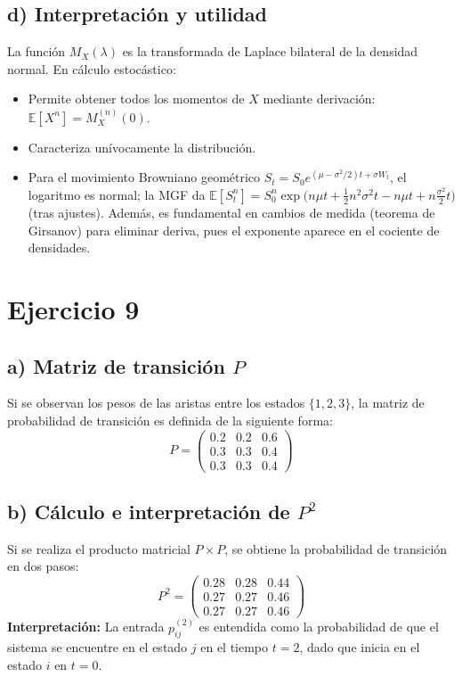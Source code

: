 \documentclass[letterpaper, 12pt]{article}
\begin{document}
    \subsection*{d) Interpretación y utilidad}
    La función \(M_X(\lambda)\) es la transformada de Laplace bilateral de la densidad normal. En cálculo estocástico:
    \begin{itemize}
    \item Permite obtener todos los momentos de \(X\) mediante derivación: \(\mathbb{E}[X^n]=M_X^{(n)}(0)\).
    \item Caracteriza unívocamente la distribución.
    \item Para el movimiento Browniano geométrico \(S_t=S_0e^{(\mu-\sigma^2/2)t+\sigma W_t}\), el logaritmo es normal; la MGF da \(\mathbb{E}[S_t^n]=S_0^n\exp\!\bigl(n\mu t+\frac{1}{2}n^2\sigma^2 t-n\mu t+n\frac{\sigma^2}{2}t\bigr)\) (tras ajustes). Además, es fundamental en cambios de medida (teorema de Girsanov) para eliminar deriva, pues el exponente aparece en el cociente de densidades.
    \end{itemize}

    \newpage

    \section*{Ejercicio 9}

    \subsection*{a) Matriz de transición $P$}
    Si se observan los pesos de las aristas entre los estados $\{1, 2, 3\}$, la matriz de probabilidad de transición es definida de la siguiente forma:
    $$P = \begin{pmatrix} 0.2 & 0.2 & 0.6 \\ 0.3 & 0.3 & 0.4 \\ 0.3 & 0.3 & 0.4 \end{pmatrix}$$

    \subsection*{b) Cálculo e interpretación de $P^2$}
    Si se realiza el producto matricial $P \times P$, se obtiene la probabilidad de transición en dos pasos:
    $$P^2 = \begin{pmatrix} 0.28 & 0.28 & 0.44 \\ 0.27 & 0.27 & 0.46 \\ 0.27 & 0.27 & 0.46 \end{pmatrix}$$
    \textbf{Interpretación:} La entrada $p_{ij}^{(2)}$ es entendida como la probabilidad de que el sistema se encuentre en el estado $j$ en el tiempo $t=2$, dado que inicia en el estado $i$ en $t=0$.
\end{document}
